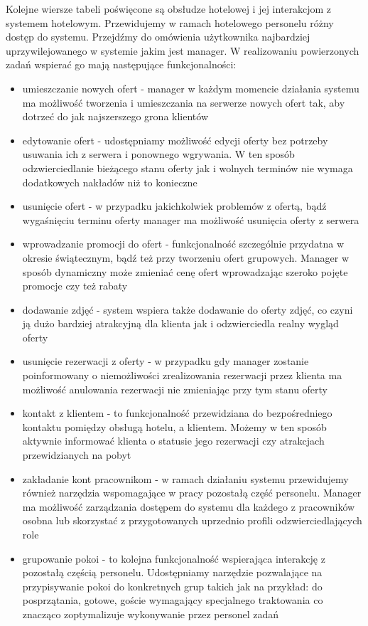 \documentclass{article}
\begin{document}
\indent \indent Kolejne wiersze tabeli poświęcone są obsłudze hotelowej i jej interakcjom z systemem hotelowym. Przewidujemy w ramach hotelowego personelu różny dostęp do systemu. Przejdźmy do omówienia użytkownika najbardziej uprzywilejowanego w systemie jakim jest manager. W realizowaniu powierzo\-nych zadań wspierać go mają następujące funkcjonalności:
\begin{itemize}
    \item umieszczanie nowych ofert - manager w każdym momencie działania systemu ma możliwość tworzenia i umieszczania na serwerze nowych ofert tak, aby dotrzeć do jak najszerszego grona klientów
    \item edytowanie ofert - udostępniamy możliwość edycji oferty bez potrzeby usuwania ich z serwera i ponownego wgrywania. W ten sposób odzwierciedlanie bieżącego stanu oferty jak i wolnych terminów nie wymaga dodatkowych nakładów niż to konieczne
    \item usunięcie ofert - w przypadku jakichkolwiek problemów z ofertą, bądź wygaśnięciu terminu oferty manager ma możliwość usunięcia oferty z serwera
    \item wprowadzanie promocji do ofert - funkcjonalność szczególnie przydatna w okresie świątecznym, bądź też przy tworzeniu ofert grupowych. Manager w sposób dynamiczny może zmieniać cenę ofert wprowadzając szeroko pojęte promocje czy też rabaty
    \item dodawanie zdjęć - system wspiera także dodawanie do oferty zdjęć, co czyni ją dużo bardziej atrakcyjną dla klienta jak i odzwierciedla realny wygląd oferty
    \item usunięcie rezerwacji z oferty - w przypadku gdy manager zostanie poinformowany o niemożliwości zrealizowania rezerwacji przez klienta ma możliwość anulowania rezerwacji nie zmieniając przy tym stanu oferty
    \item kontakt z klientem - to funkcjonalność przewidziana do bezpośredniego kontaktu pomiędzy obsługą hotelu, a klientem. Możemy w ten sposób aktywnie informować klienta o statusie jego rezerwacji czy atrakcjach przewidzianych na pobyt   
    \item zakładanie kont pracownikom - w ramach działaniu systemu przewidujemy również narzędzia wspomagające w pracy pozostałą część personelu. Manager ma możliwość zarządzania dostępem do systemu dla każdego z pracowników osobna lub skorzystać z przygotowanych uprzednio profili odzwierciedlających role
    \item grupowanie pokoi - to kolejna funkcjonalność wspierająca interakcję z pozostałą częścią personelu. Udostępniamy narzędzie pozwalające na przypisywanie pokoi do konkretnych grup takich jak na przykład: do posprzątania, gotowe, goście wymagający specjalnego traktowania co znacząco zoptymalizuje wykonywanie przez personel zadań
\end{itemize}
\end{document}
